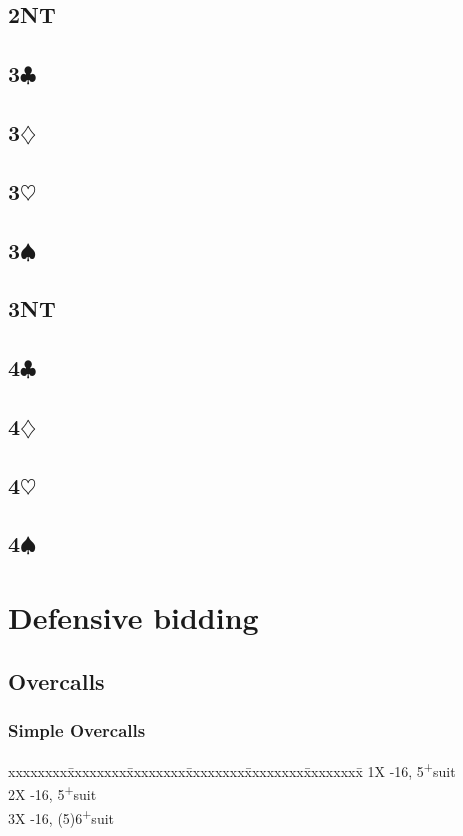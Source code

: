 \documentclass[10pt]{article}
\renewcommand{\c}{$\clubsuit$}
\renewcommand{\d}{$\diamondsuit$}
\newcommand{\h}{$\heartsuit$}
\newcommand{\s}{$\spadesuit$}
\newcommand{\p}{\textsuperscript{+}}
\newenvironment{bidtable}[1][]
{\textbf{#1}
  \begin{adjustwidth}{1em}{}
    \addvspace{2pt}
    \begin{tabbing}
      xxxxxxxx\=xxxxxxxx\=xxxxxxxx\=xxxxxxxx\=xxxxxxxx\=xxxxxxxx\=\kill}
{\end{tabbing}\end{adjustwidth}\bigskip}%
\newcommand{\pdfc}{\texorpdfstring{\c{}}{C}}
\newcommand{\pdfd}{\texorpdfstring{\d{}}{D}}
\newcommand{\pdfh}{\texorpdfstring{\h{}}{H}}
\newcommand{\pdfs}{\texorpdfstring{\s{}}{S}}
\begin{document}
\begin{multicols*}{2}
\subsection{2NT}
\subsection{3\pdfc}
\subsection{3\pdfd}
\subsection{3\pdfh}
\subsection{3\pdfs}
\subsection{3NT}
\subsection{4\pdfc}
\subsection{4\pdfd}
\subsection{4\pdfh}
\subsection{4\pdfs}

\section{Defensive bidding}
\subsection{Overcalls}

\subsubsection{Simple Overcalls}

\begin{bidtable}
1X -16, 5\p suit     \\
2X -16, 5\p suit    \\
3X -16, (5)6\p suit
\end{bidtable}


\end{multicols*}
\end{document}
